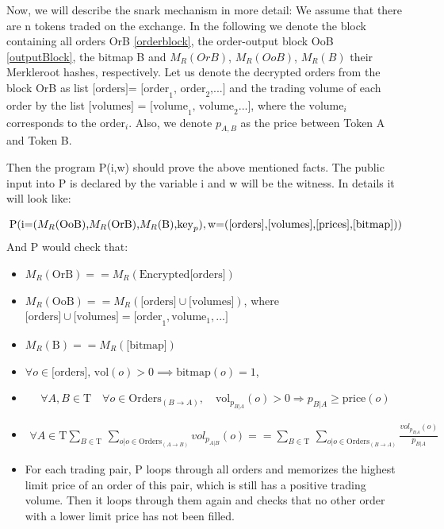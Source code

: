 \documentclass[11pt,parskip=full]{scrartcl}%
\newcommand{\Tau}{\mathrm{T}}
\begin{document}
Now, we will describe the snark mechanism in more detail: We assume that there are n tokens traded on the exchange.
In the following we denote the block containing all orders OrB \ref{orderblock}, the order-output block OoB \ref{outputBlock}, the bitmap B and $M_R(OrB)$, $M_R(OoB)$, $M_R(B)$ their Merkleroot hashes, respectively.
Let us denote the decrypted orders from the block OrB as list $\text{[orders]= [order}_1\text{, order}_2\text{,...]}$ and the trading volume of each order by the list $\text{[volumes] = [volume}_1\text{, volume}_2\text{...]}$, where the $\text{volume}_i$ corresponds to the $\text{order}_i$.
Also, we denote  $p_{A,B}$ as the price between Token A and Token B.

Then the program P(i,w) should prove the above mentioned facts.
The public input into P is declared by the variable i and w will be the witness.
In details it will look like:

\begin{equation}
\text{P(i=(}M_R\text{(OoB),}M_R\text{(OrB),}M_R\text{(B),} \text{key}_p),\\
\text{w=([orders],[volumes],[prices],[bitmap]))} 
\end{equation}
And P would check that:
\begin{itemize}
\item  $M_R(\text{OrB}) == M_R(\text{Encrypted[orders]})$
\item  $M_R(\text{OoB}) == M_R(\text{[orders]} \cup \text{[volumes]})$,\newline
where $\text{[orders]} \cup \text{[volumes]} = \text{[order}_1, \text{volume}_1, ...] $
\item $ M_R(\text{B}) == M_R(\text{[bitmap]})$
\item $\forall o \in \text{[orders], vol}(o)>0 \implies \text{bitmap}(o) = 1 $, 

\item 
\begin{equation} \forall A,B \in \Tau  \quad \forall o \in \text{Orders}_{(B\rightarrow A)}, \quad \text{vol}_{p_{B|A}}(o)>0 \Rightarrow p_{B|A}\geq \text{price}(o)
\end{equation}
\item 
\begin{equation}
\begin{split}
\forall A \in \Tau \sum_{B\in \Tau} \,
\sum_{o| o\in \text{Orders}_{(A\rightarrow B)}} vol_{p_{A|B}}(o) == \sum_{B\in \Tau} \, \sum_{o| o\in \text{Orders}_{(B\rightarrow A)}} \frac{vol_{p_{B|A}}(o)}{p_{B|A}}
\end{split}
\end{equation}
\item For each trading pair, P loops through all orders and memorizes the highest limit price of an order of this pair, which is still has a positive trading volume.
Then it loops through them again and checks that no other order with a lower limit price has not been filled.
\end{itemize}
\end{document}
